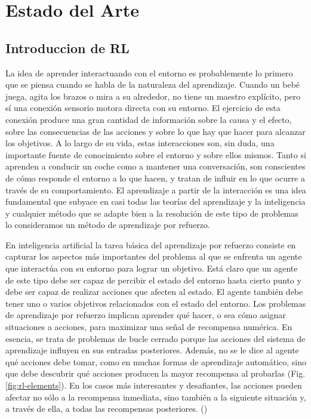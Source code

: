 \chapter{Estado del Arte}\label{chapter:state-of-the-art}

\section{Introduccion de RL}\label{section:state-of-the-art:introduction-to-RL}

La idea de aprender interactuando con el entorno es probablemente lo primero que se piensa cuando se habla de la naturaleza del aprendizaje. Cuando un bebé juega, agita los brazos o mira a su alrededor, no tiene un maestro explícito, pero sí una conexión sensorio motora directa con su entorno. El ejercicio de esta conexión produce una gran cantidad de información sobre la causa y el efecto, sobre las consecuencias de las acciones y sobre lo que hay que hacer para alcanzar los objetivos. A lo largo de su vida, estas interacciones son, sin duda, una importante fuente de conocimiento sobre el entorno y sobre ellos mismos. Tanto si aprenden a conducir un coche como a mantener una conversación, son conscientes de cómo responde el entorno a lo que hacen, y tratan de influir en lo que ocurre a través de su comportamiento. El aprendizaje a partir de la interacción es una idea fundamental que subyace en casi todas las teorías del aprendizaje y la inteligencia y cualquier método que se adapte bien a la resolución de este tipo de problemas lo consideramos un método de aprendizaje por refuerzo.

En inteligencia artificial la tarea básica del aprendizaje por refuerzo consiste en capturar los aspectos más importantes del problema al que se enfrenta un agente que interactúa con su entorno para lograr un objetivo. Está claro que un agente de este tipo debe ser capaz de percibir el estado del entorno hasta cierto punto y debe ser capaz de realizar acciones que afecten al estado. El agente también debe tener uno o varios objetivos relacionados con el estado del entorno. Los problemas de aprendizaje por refuerzo implican aprender qué hacer, o sea cómo asignar situaciones a acciones, para maximizar una señal de recompensa numérica. En esencia, se trata de problemas de bucle cerrado porque las acciones del sistema de aprendizaje influyen en sus entradas posteriores. Además, no se le dice al agente qué acciones debe tomar, como en muchas formas de aprendizaje automático, sino que debe descubrir qué acciones producen la mayor recompensa al probarlas (Fig. \ref{fig:rl-elements}). En los casos más interesantes y desafiantes, las acciones pueden afectar no sólo a la recompensa inmediata, sino también a la siguiente situación y, a través de ella, a todas las recompensas posteriores. (\cite{sutton1998introduction})

